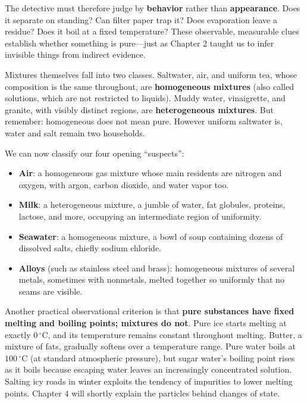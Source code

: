 The detective must therefore judge by \textbf{behavior} rather than \textbf{appearance}. Does it separate on standing? Can filter paper trap it? Does evaporation leave a residue? Does it boil at a fixed temperature? These observable, measurable clues establish whether something is pure---just as Chapter 2 taught us to infer invisible things from indirect evidence.

Mixtures themselves fall into two classes. Saltwater, air, and uniform tea, whose composition is the same throughout, are \textbf{homogeneous mixtures} (also called solutions, which are not restricted to liquids). Muddy water, vinaigrette, and granite, with visibly distinct regions, are \textbf{heterogeneous mixtures}. But remember: homogeneous does not mean pure. However uniform saltwater is, water and salt remain two households.

We can now classify our four opening ``suspects'':

\begin{itemize}[itemsep=2pt]
\item \textbf{Air}: a homogeneous gas mixture whose main residents are nitrogen and oxygen, with argon, carbon dioxide, and water vapor too.
\item \textbf{Milk}: a heterogeneous mixture, a jumble of water, fat globules, proteins, lactose, and more, occupying an intermediate region of uniformity.
\item \textbf{Seawater}: a homogeneous mixture, a bowl of soup containing dozens of dissolved salts, chiefly sodium chloride.
\item \textbf{Alloys} (such as stainless steel and brass): homogeneous mixtures of several metals, sometimes with nonmetals, melted together so uniformly that no seams are visible.
\end{itemize}

Another practical observational criterion is that \textbf{pure substances have fixed melting and boiling points; mixtures do not}. Pure ice starts melting at exactly $0\,^{\circ}\mathrm{C}$, and its temperature remains constant throughout melting. Butter, a mixture of fats, gradually softens over a temperature range. Pure water boils at $100\,^{\circ}\mathrm{C}$ (at standard atmospheric pressure), but sugar water's boiling point rises as it boils because escaping water leaves an increasingly concentrated solution. Salting icy roads in winter exploits the tendency of impurities to lower melting points. Chapter 4 will shortly explain the particles behind changes of state.

